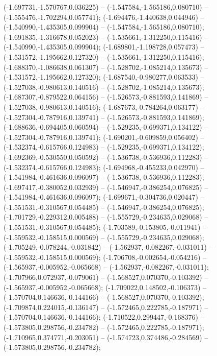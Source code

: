  (-1.697731,-1.570767,0.036225) -- (-1.547584,-1.565186,0.080710) -- (-1.555476,-1.702294,0.057741);
 (-1.694476,-1.440638,0.044946) -- (-1.540990,-1.435305,0.099904) -- (-1.547584,-1.565186,0.080710);
 (-1.691835,-1.316678,0.052023) -- (-1.535661,-1.312250,0.115416) -- (-1.540990,-1.435305,0.099904);
 (-1.689801,-1.198728,0.057473) -- (-1.531572,-1.195662,0.127320) -- (-1.535661,-1.312250,0.115416);
 (-1.688370,-1.086638,0.061307) -- (-1.528702,-1.085214,0.135673) -- (-1.531572,-1.195662,0.127320);
 (-1.687540,-0.980277,0.063533) -- (-1.527038,-0.980613,0.140516) -- (-1.528702,-1.085214,0.135673);
 (-1.687307,-0.879522,0.064156) -- (-1.526573,-0.881593,0.141869) -- (-1.527038,-0.980613,0.140516);
 (-1.687673,-0.784264,0.063177) -- (-1.527304,-0.787916,0.139741) -- (-1.526573,-0.881593,0.141869);
 (-1.688636,-0.694405,0.060594) -- (-1.529235,-0.699371,0.134122) -- (-1.527304,-0.787916,0.139741);
 (-1.690201,-0.609859,0.056402) -- (-1.532374,-0.615766,0.124983) -- (-1.529235,-0.699371,0.134122);
 (-1.692369,-0.530550,0.050592) -- (-1.536738,-0.536936,0.112283) -- (-1.532374,-0.615766,0.124983);
 (-1.694968,-0.455233,0.042970) -- (-1.541984,-0.461636,0.096097) -- (-1.536738,-0.536936,0.112283);
 (-1.697417,-0.380052,0.032939) -- (-1.546947,-0.386254,0.076825) -- (-1.541984,-0.461636,0.096097);
 (-1.699671,-0.304736,0.020447) -- (-1.551531,-0.310567,0.054485) -- (-1.546947,-0.386254,0.076825);
 (-1.701729,-0.229312,0.005488) -- (-1.555729,-0.234635,0.029068) -- (-1.551531,-0.310567,0.054485);
 (-1.703589,-0.153805,-0.011941) -- (-1.559532,-0.158515,0.000569) -- (-1.555729,-0.234635,0.029068);
 (-1.705249,-0.078244,-0.031842) -- (-1.562937,-0.082267,-0.031011) -- (-1.559532,-0.158515,0.000569);
 (-1.706708,-0.002654,-0.054216) -- (-1.565937,-0.005952,-0.065668) -- (-1.562937,-0.082267,-0.031011);
 (-1.707966,0.072937,-0.079061) -- (-1.568527,0.070370,-0.103392) -- (-1.565937,-0.005952,-0.065668);
 (-1.709022,0.148502,-0.106373) -- (-1.570704,0.146636,-0.144166) -- (-1.568527,0.070370,-0.103392);
 (-1.709874,0.224015,-0.136147) -- (-1.572465,0.222785,-0.187971) -- (-1.570704,0.146636,-0.144166);
 (-1.710522,0.299447,-0.168376) -- (-1.573805,0.298756,-0.234782) -- (-1.572465,0.222785,-0.187971);
 (-1.710965,0.374771,-0.203051) -- (-1.574723,0.374486,-0.284569) -- (-1.573805,0.298756,-0.234782);
